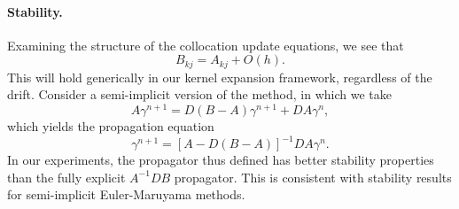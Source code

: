 \documentclass[11pt,letterpaper]{article}
\begin{document}
\paragraph{Stability.} Examining the structure of the collocation update equations, we see that
\[
B_{kj} = A_{kj} + O(h).
\]
This will hold generically in our kernel expansion framework, regardless of the drift.  Consider a semi-implicit version of the method, in which we take
\[
A \gamma^{n+1} = D (B - A) \gamma^{n+1} + D A \gamma^n,
\]
which yields the propagation equation
\[
\gamma^{n+1} = \left[ A - D(B-A) \right]^{-1} D A \gamma^n.
\]
In our experiments, the propagator thus defined has better stability properties than the fully explicit $A^{-1} D B$ propagator. This is consistent with stability results for semi-implicit Euler-Maruyama methods.
\end{document}
